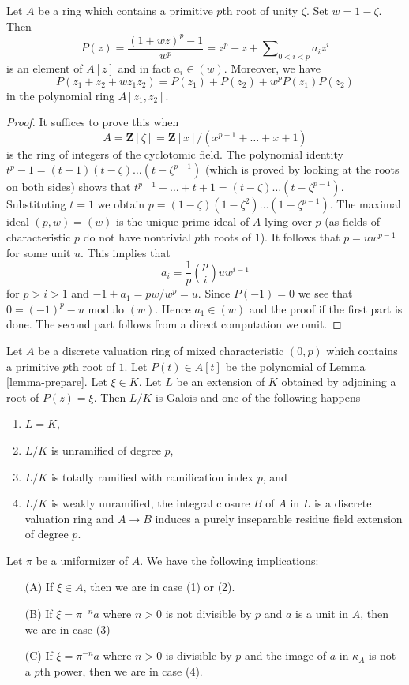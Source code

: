 \begin{lemma}
\label{lemma-prepare}
Let $A$ be a ring which contains a primitive $p$th root of unity $\zeta$.
Set $w = 1 - \zeta$. Then
$$
P(z) = \frac{(1 + wz)^p - 1}{w^p} =
z^p - z + \sum\nolimits_{0 < i < p} a_i z^i
$$
is an element of $A[z]$ and in fact $a_i \in (w)$. Moreover, we have
$$
P(z_1 + z_2 + w z_1 z_2) = P(z_1) + P(z_2) + w^p P(z_1) P(z_2)
$$
in the polynomial ring $A[z_1, z_2]$.
\end{lemma}

\begin{proof}
It suffices to prove this when
$$
A = \mathbf{Z}[\zeta] = \mathbf{Z}[x]/(x^{p - 1} + \ldots + x + 1)
$$
is the ring of integers of the cyclotomic field. The polynomial identity
$t^p - 1 = (t - 1)(t - \zeta) \ldots (t - \zeta^{p - 1})$
(which is proved by looking at the roots on both sides)
shows that
$t^{p - 1} + \ldots + t + 1 = (t - \zeta) \ldots (t - \zeta^{p - 1})$.
Substituting $t = 1$ we obtain
$p = (1 - \zeta)(1 - \zeta^2) \ldots (1 - \zeta^{p - 1})$.
The maximal ideal $(p, w) = (w)$ is the unique prime ideal of $A$
lying over $p$ (as fields of characteristic $p$ do not have nontrivial
$p$th roots of $1$). It follows that $p = u w^{p - 1}$ for some unit $u$.
This implies that
$$
a_i = \frac{1}{p} {p \choose i} u w^{i - 1}
$$
for $p > i > 1$ and $- 1 + a_1 = pw/w^p = u$. Since $P(-1) = 0$ we
see that $0 = (-1)^p - u$ modulo $(w)$. Hence $a_1 \in (w)$ and the
proof if the first part is done. The second part follows from a direct
computation we omit.
\end{proof}

\begin{lemma}
\label{lemma-extension-defined-by-nice-polynial}
Let $A$ be a discrete valuation ring of mixed characteristic $(0, p)$
which contains a primitive $p$th root of $1$.
Let $P(t) \in A[t]$ be the polynomial of Lemma \ref{lemma-prepare}.
Let $\xi \in K$.
Let $L$ be an extension of $K$ obtained by
adjoining a root of $P(z) = \xi$. Then $L/K$ is Galois and one of the
following happens
\begin{enumerate}
\item $L = K$,
\item $L / K$ is unramified of degree $p$,
\item $L / K$ is totally ramified with ramification index $p$, and
\item $L / K$ is weakly unramified, the integral closure $B$ of $A$ in $L$
is a discrete valuation ring and $A \to B$ induces a purely inseparable
residue field extension of degree $p$.
\end{enumerate}
Let $\pi$ be a uniformizer of $A$. We have the following implications:
\begin{enumerate}
\item[(A)] If $\xi \in A$, then we are in case (1) or (2).
\item[(B)] If $\xi = \pi^{-n}a$ where $n > 0$ is not divisible by
$p$ and $a$ is a unit in $A$, then we are in case (3)
\item[(C)] If $\xi = \pi^{-n} a$ where $n > 0$ is divisible by $p$ and
the image of $a$ in $\kappa_A$ is not a $p$th power, then we are in case (4).
\end{enumerate}
\end{lemma}

